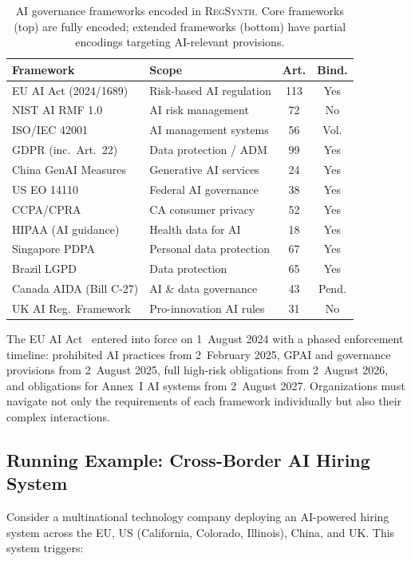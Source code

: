 \documentclass[11pt,twocolumn]{article}
\newcommand{\regsynth}{\textsc{RegSynth}}
\begin{document}
\begin{table}[t]
\centering
\caption{AI governance frameworks encoded in \regsynth{}. Core frameworks
(top) are fully encoded; extended frameworks (bottom) have partial
encodings targeting AI-relevant provisions.}
\label{tab:frameworks}
\small
\begin{tabularx}{\columnwidth}{lXcc}
\toprule
\textbf{Framework} & \textbf{Scope} & \textbf{Art.} & \textbf{Bind.} \\
\midrule
EU AI Act (2024/1689) & Risk-based AI regulation & 113 & Yes \\
NIST AI RMF 1.0 & AI risk management & 72 & No \\
ISO/IEC 42001 & AI management systems & 56 & Vol. \\
GDPR (inc.\ Art.~22) & Data protection / ADM & 99 & Yes \\
China GenAI Measures & Generative AI services & 24 & Yes \\
\midrule
US EO 14110 & Federal AI governance & 38 & Yes \\
CCPA/CPRA & CA consumer privacy & 52 & Yes \\
HIPAA (AI guidance) & Health data for AI & 18 & Yes \\
Singapore PDPA & Personal data protection & 67 & Yes \\
Brazil LGPD & Data protection & 65 & Yes \\
Canada AIDA (Bill C-27) & AI \& data governance & 43 & Pend. \\
UK AI Reg.\ Framework & Pro-innovation AI rules & 31 & No \\
\bottomrule
\end{tabularx}
\end{table}

The EU AI Act~\cite{euaiact2024} entered into force on 1~August 2024 with a
phased enforcement timeline: prohibited AI practices from 2~February 2025,
GPAI and governance provisions from 2~August 2025, full high-risk obligations
from 2~August 2026, and obligations for Annex~I AI systems from 2~August 2027.
Organizations must navigate not only the requirements of each framework
individually but also their complex interactions.

\subsection{Running Example: Cross-Border AI Hiring System}

Consider a multinational technology company deploying an AI-powered
hiring system across the EU, US (California, Colorado, Illinois), China, and UK.
This system triggers:
\end{document}
